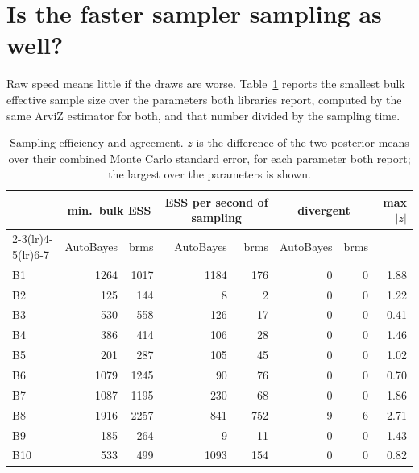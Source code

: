 \documentclass[11pt]{article}
\begin{document}
\section{Is the faster sampler sampling as well?}

Raw speed means little if the draws are worse. Table~\ref{tab:eff} reports the smallest bulk effective sample size over
the parameters both libraries report, computed by the same ArviZ estimator for both, and that number divided by the
sampling time.

\begin{table}[h]
\small
\begin{center}\begin{tabular}{@{}lrrrrrrr@{}}
\toprule
& \multicolumn{2}{c}{min.\ bulk ESS} & \multicolumn{2}{c}{ESS per second of sampling} & \multicolumn{2}{c}{divergent} & max $|z|$ \\
\cmidrule(lr){2-3}\cmidrule(lr){4-5}\cmidrule(lr){6-7}
& AutoBayes & brms & AutoBayes & brms & AutoBayes & brms & \\
\midrule
B1 & 1264 & 1017 & 1184 & 176 & 0 & 0 & 1.88 \\
B2 & 125 & 144 & 8 & 2 & 0 & 0 & 1.22 \\
B3 & 530 & 558 & 126 & 17 & 0 & 0 & 0.41 \\
B4 & 386 & 414 & 106 & 28 & 0 & 0 & 1.46 \\
B5 & 201 & 287 & 105 & 45 & 0 & 0 & 1.02 \\
B6 & 1079 & 1245 & 90 & 76 & 0 & 0 & 0.70 \\
B7 & 1087 & 1195 & 230 & 68 & 0 & 0 & 1.86 \\
B8 & 1916 & 2257 & 841 & 752 & 9 & 6 & 2.71 \\
B9 & 185 & 264 & 9 & 11 & 0 & 0 & 1.43 \\
B10 & 533 & 499 & 1093 & 154 & 0 & 0 & 0.82 \\
\bottomrule
\end{tabular}\end{center}
\caption{\small Sampling efficiency and agreement. $z$ is the difference of the two posterior means over their combined
Monte Carlo standard error, for each parameter both report; the largest over the parameters is shown.}\label{tab:eff}
\end{table}
\end{document}
